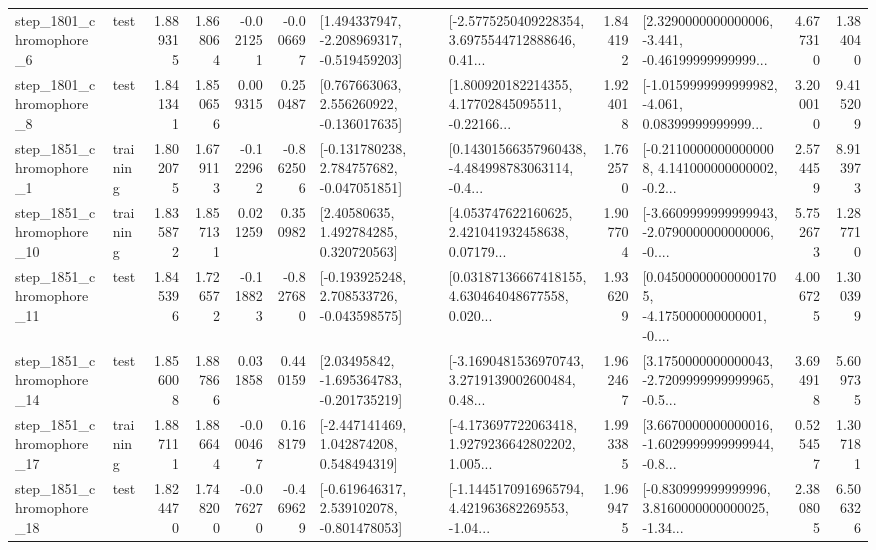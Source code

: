 \begin{tabular}{llrrrrllrlrr}
  step\_1801\_chromophore\_6 &      test &      1.889315 &    1.868064 &     -0.021251 & -0.006697 &   [1.494337947, -2.208969317, -0.519459203] &  [-2.5775250409228354, 3.6975544712888646, 0.41... &       1.844192 &  [2.3290000000000006, -3.441, -0.46199999999999... &            4.677310 &          1.384040 \\
  step\_1801\_chromophore\_8 &      test &      1.841341 &    1.850656 &      0.009315 &  0.250487 &    [0.767663063, 2.556260922, -0.136017635] &  [1.800920182214355, 4.17702845095511, -0.22166... &       1.924018 &  [-1.0159999999999982, -4.061, 0.08399999999999... &            3.200010 &          9.415209 \\
  step\_1851\_chromophore\_1 &  training &      1.802075 &    1.679113 &     -0.122962 & -0.862506 &   [-0.131780238, 2.784757682, -0.047051851] &  [0.14301566357960438, -4.484998783063114, -0.4... &       1.762570 &  [-0.21100000000000008, 4.141000000000002, -0.2... &            2.574459 &          8.913973 \\
 step\_1851\_chromophore\_10 &  training &      1.835872 &    1.857131 &      0.021259 &  0.350982 &      [2.40580635, 1.492784285, 0.320720563] &  [4.053747622160625, 2.421041932458638, 0.07179... &       1.907704 &  [-3.6609999999999943, -2.0790000000000006, -0.... &            5.752673 &          1.287710 \\
 step\_1851\_chromophore\_11 &      test &      1.845396 &    1.726572 &     -0.118823 & -0.827680 &   [-0.193925248, 2.708533726, -0.043598575] &  [0.03187136667418155, 4.630464048677558, 0.020... &       1.936209 &  [0.045000000000001705, -4.175000000000001, -0.... &            4.006725 &          1.300399 \\
 step\_1851\_chromophore\_14 &      test &      1.856008 &    1.887866 &      0.031858 &  0.440159 &    [2.03495842, -1.695364783, -0.201735219] &  [-3.1690481536970743, 3.2719139002600484, 0.48... &       1.962467 &  [3.1750000000000043, -2.7209999999999965, -0.5... &            3.694918 &          5.609735 \\
 step\_1851\_chromophore\_17 &  training &      1.887111 &    1.886644 &     -0.000467 &  0.168179 &    [-2.447141469, 1.042874208, 0.548494319] &  [-4.173697722063418, 1.9279236642802202, 1.005... &       1.993385 &  [3.6670000000000016, -1.6029999999999944, -0.8... &            0.525457 &          1.307181 \\
 step\_1851\_chromophore\_18 &      test &      1.824470 &    1.748200 &     -0.076270 & -0.469629 &   [-0.619646317, 2.539102078, -0.801478053] &  [-1.1445170916965794, 4.421963682269553, -1.04... &       1.969475 &  [-0.830999999999996, 3.8160000000000025, -1.34... &            2.380805 &          6.506326 \\

\end{tabular}
